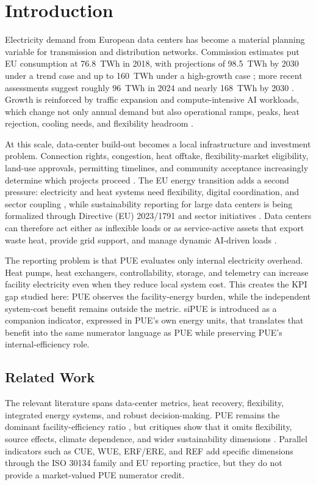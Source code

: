 \documentclass[preprint,12pt]{elsarticle}
\begin{document}
\section{Introduction}
\label{sec:introduction}

Electricity demand from European data centers has become a material planning variable for transmission and distribution networks. Commission estimates put EU consumption at 76.8~TWh in 2018, with projections of 98.5~TWh by 2030 under a trend case and up to 160~TWh under a high-growth case \cite{1}; more recent assessments suggest roughly 96~TWh in 2024 and nearly 168~TWh by 2030 \cite{2}. Growth is reinforced by traffic expansion and compute-intensive AI workloads, which change not only annual demand but also operational ramps, peaks, heat rejection, cooling needs, and flexibility headroom \cite{14,19}.

At this scale, data-center build-out becomes a local infrastructure and investment problem. Connection rights, congestion, heat offtake, flexibility-market eligibility, land-use approvals, permitting timelines, and community acceptance increasingly determine which projects proceed \cite{6,21}. The EU energy transition adds a second pressure: electricity and heat systems need flexibility, digital coordination, and sector coupling \cite{7,8}, while sustainability reporting for large data centers is being formalized through Directive (EU) 2023/1791 and sector initiatives \cite{15,16}. Data centers can therefore act either as inflexible loads or as service-active assets that export waste heat, provide grid support, and manage dynamic AI-driven loads \cite{11,13}.

The reporting problem is that PUE evaluates only internal electricity overhead. Heat pumps, heat exchangers, controllability, storage, and telemetry can increase facility electricity even when they reduce local system cost. This creates the KPI gap studied here: PUE observes the facility-energy burden, while the independent system-cost benefit remains outside the metric. siPUE is introduced as a companion indicator, expressed in PUE's own energy units, that translates that benefit into the same numerator language as PUE while preserving PUE's internal-efficiency role.

\subsection{Related Work}
\label{sec:related}

The relevant literature spans data-center metrics, heat recovery, flexibility, integrated energy systems, and robust decision-making. PUE remains the dominant facility-efficiency ratio \cite{Belady2008PUE,greengrid2014}, but critiques show that it omits flexibility, source effects, climate dependence, and wider sustainability dimensions \cite{Reddy2017,VandeVoort2017}. Parallel indicators such as CUE, WUE, ERF/ERE, and REF add specific dimensions through the ISO 30134 family and EU reporting practice, but they do not provide a market-valued PUE numerator credit.
\end{document}
